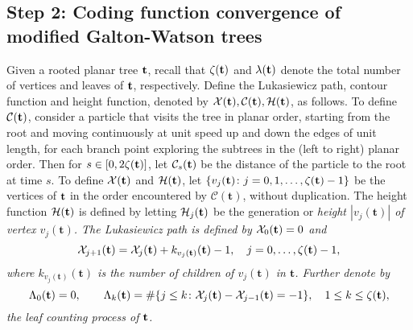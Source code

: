 \documentclass[11pt,a4paper]{article}
\newcommand{\cC}{\mathcal{C}}
\newcommand{\ft}{\mathbf{t}}
\begin{document}
\subsection{Step 2: Coding function convergence of modified Galton-Watson trees}



Given a rooted planar tree ${\bf t}$, recall that  $\zeta({\bf t})$ and $\lambda({\bf t})$ denote the total number of vertices and leaves of ${\bf t}$, respectively. Define the Lukasiewicz path, contour function and height function, denoted by ${\cal X}({\bf t}), {\cal C}({\bf t}), {\cal H}({\bf t})$, as follows.  To define ${\cal C} ({\bf t})$, consider a particle that visits the tree in planar order, starting from the root and moving continuously at unit speed up and down the edges of unit length, for each branch point exploring the subtrees in the (left to right) planar order. Then for $s\in [0, 2\zeta({\bf t})]$,  let ${\cal C}_s({\bf t})$ be the distance of the particle  to the root at time $s$.  To define ${\cal X}({\bf t})$ and  ${\cal H}({\bf t})$,  let $\{{v}_j(\ft)\colon j=0,1 ,\ldots, \zeta({\bf t})-1\}$ be the vertices of ${\bf t}$ in the order encountered by $\cC(\ft)$, without duplication.  The height function ${\cal H}({\bf t})$ is defined by letting ${\cal H}_j({\bf t})$ be the generation or \em height \em $|v_j(\ft)|$ of vertex $v_j(\ft)$. The  Lukasiewicz path is defined by ${\cal X}_0({\bf t})=0$ and
$$
{\cal X}_{j+1}({\bf t})={\cal X}_j({\bf t})+k_{v_j(\ft)}(\ft)-1,\quad j=0,\ldots, \zeta({\bf t})-1,
$$
where $ k_{v_j(\ft)}(\ft)$ is the number of children of $v_j(\ft)$ in $\ft$.
Further denote by 
$$\Lambda_0(\ft)=0,\qquad\Lambda_k({\bf t})=\#\{j\le k\colon{\cal X}_j({\bf t})-{\cal X}_{j-1}({\bf t})=-1\},\quad 1\le k\le\zeta({\bf t}),$$ 
the leaf counting process of ${\bf t}$.
\end{document}
